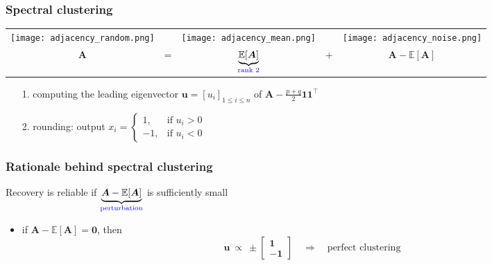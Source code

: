 \documentclass[compress,
mathserif,wide,%
]{beamer}
\begin{document}
\begin{frame}
\frametitle{Spectral clustering}

		
\begin{center}
\begin{tabular}{ccccc}
\texttt{[image: adjacency\_random.png]} &   & \texttt{[image: adjacency\_mean.png]} &  & \texttt{[image: adjacency\_noise.png]}\tabularnewline
	$\bm{A}$ & = & $\underset{\textcolor{blue}{ \text{rank 2}}}{\underbrace{\mathbb{E}[\bm{A}]}}$ & + & $\bm{A}-\mathbb{E}\left[\bm{A}\right]$\tabularnewline
\end{tabular}
\end{center}

\vspace{-0.5em}
\begin{itemize}
	\item[{\color{black}1.}] computing the leading eigenvector $\bm{u}=[u_i]_{1\leq i\leq n}$ of $\bm{A} - \frac{p+q}{2}\bm{1}\bm{1}^{\top}$
	\item[{\color{black}2.}] rounding:  output
		${x}_{i}=\begin{cases}
			1, & \text{if }u_{i}>0\\
			-1, & \text{if }u_{i}<0
\end{cases}$
\end{itemize}




\end{frame}




\begin{frame}
\frametitle{Rationale behind spectral clustering}

\bigskip

Recovery is reliable if $\underset{\textcolor{blue}{ \text{perturbation}}}{\underbrace{ \bm{A}-\mathbb{E}[\bm{A}] }}$ is sufficiently small

\begin{itemize}
	\item if $\bm{A}-\mathbb{E}[\bm{A}]=\bm{0}$, then
\[
\bm{u} ~\propto~ \pm \left[\begin{array}{c}
\bm{1}\\
-\bm{1}
\end{array}\right]  \quad \Longrightarrow \quad \text{perfect clustering}
\]
\end{itemize}


%



\end{frame}
\end{document}

